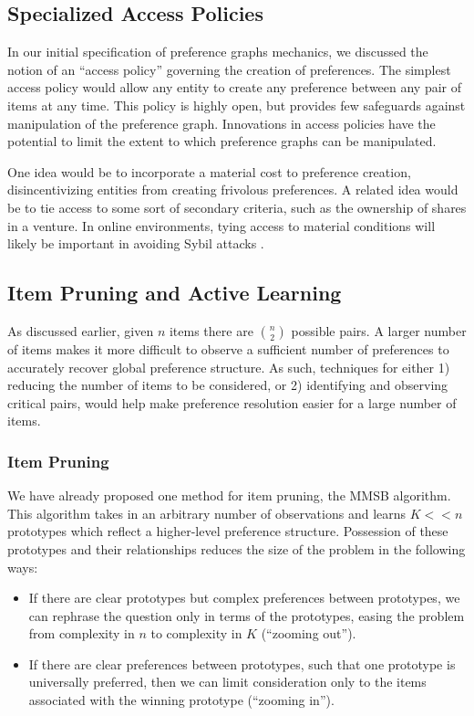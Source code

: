 \subsection{Specialized Access Policies}

In our initial specification of preference graphs mechanics, we discussed the notion of an ``access policy'' governing the creation of preferences.
The simplest access policy would allow any entity to create any preference between any pair of items at any time.
This policy is highly open, but provides few safeguards against manipulation of the preference graph.
Innovations in access policies have the potential to limit the extent to which preference graphs can be manipulated.

One idea would be to incorporate a material cost to preference creation, disincentivizing  entities from creating frivolous preferences.
A related idea would be to tie access to some sort of secondary criteria, such as the ownership of shares in a venture.
In online environments, tying access to material conditions will likely be important in avoiding Sybil attacks \citep{danezis:2006}.

\subsection{Item Pruning and Active Learning}

As discussed earlier, given $n$ items there are $n\choose{2}$ possible pairs.
A larger number of items makes it more difficult to observe a sufficient number of preferences to accurately recover global preference structure.
As such, techniques for either 1) reducing the number of items to be considered, or 2) identifying and observing critical pairs, would help make preference resolution easier for a large number of items.

\subsubsection{Item Pruning}

We have already proposed one method for item pruning, the MMSB algorithm.
This algorithm takes in an arbitrary number of observations and learns $K << n$ prototypes which reflect a higher-level preference structure.
Possession of these prototypes and their relationships reduces the size of the problem in the following ways: 

\begin{itemize}
	\item If there are clear prototypes but complex preferences between prototypes, we can rephrase the question only in terms of the prototypes, easing the problem from complexity in $n$ to complexity in $K$ (``zooming out'').
	\item If there are clear preferences between prototypes, such that one prototype is universally preferred, then we can limit consideration only to the items associated with the winning prototype (``zooming in'').
\end{itemize}

